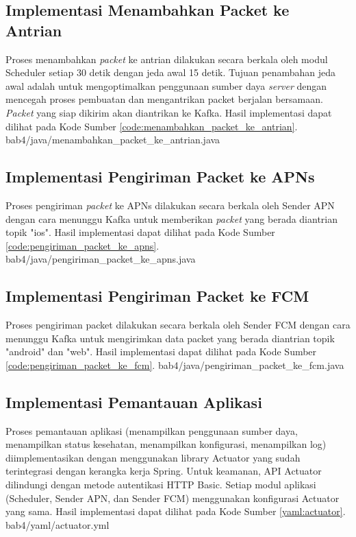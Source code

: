\subsection{Implementasi Menambahkan Packet ke Antrian}
\par Proses menambahkan \textit{packet} ke antrian dilakukan secara berkala oleh modul Scheduler setiap 30 detik dengan jeda awal 15 detik. Tujuan penambahan jeda awal adalah untuk mengoptimalkan penggunaan sumber daya \textit{server} dengan mencegah proses pembuatan dan mengantrikan packet berjalan bersamaan. \textit{Packet} yang siap dikirim akan diantrikan ke Kafka. Hasil implementasi dapat dilihat pada Kode Sumber \ref{code:menambahkan_packet_ke_antrian}.
 {bab4/java/menambahkan_packet_ke_antrian.java}

\subsection{Implementasi Pengiriman Packet ke APNs}
\par Proses pengiriman \textit{packet} ke APNs dilakukan secara berkala oleh Sender APN dengan cara menunggu Kafka untuk memberikan \textit{packet} yang berada diantrian topik "ios". Hasil implementasi dapat dilihat pada Kode Sumber \ref{code:pengiriman_packet_ke_apns}.
 {bab4/java/pengiriman_packet_ke_apns.java}

\subsection{Implementasi Pengiriman Packet ke FCM}
\par Proses pengiriman packet dilakukan secara berkala oleh Sender FCM dengan cara menunggu Kafka untuk mengirimkan data packet yang berada diantrian topik "android" dan "web". Hasil implementasi dapat dilihat pada Kode Sumber \ref{code:pengiriman_packet_ke_fcm}.
 {bab4/java/pengiriman_packet_ke_fcm.java}

\subsection{Implementasi Pemantauan Aplikasi}
\par Proses pemantauan aplikasi (menampilkan penggunaan sumber daya, menampilkan status kesehatan, menampilkan konfigurasi, menampilkan log) diimplementasikan dengan menggunakan library Actuator yang sudah terintegrasi dengan kerangka kerja Spring. Untuk keamanan, API Actuator dilindungi dengan metode autentikasi HTTP Basic. Setiap modul aplikasi (Scheduler, Sender APN, dan Sender FCM) menggunakan konfigurasi Actuator yang sama. Hasil implementasi dapat dilihat pada Kode Sumber \ref{yaml:actuator}.
 {bab4/yaml/actuator.yml}

